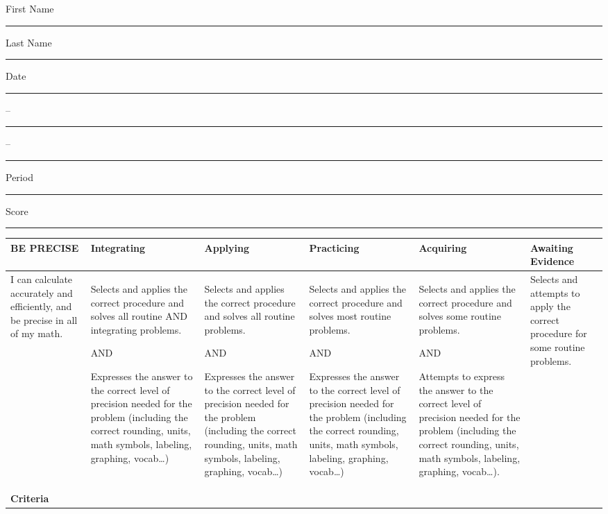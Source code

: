 \documentclass[twoside, 10pt]{article}
\title{}
\date{}
\begin{document}
\noindent
{\large
First Name \rule{6em}{.1pt}Last Name \rule{6em}{.1pt} Date \rule{1.5em}{.1pt} -- \rule{1.5em}{.1pt} -- \rule{1.5em}{.1pt} Period \rule{2em}{.1pt} Score \rule{2em}{.1pt}
}
\vspace{1em}

\begingroup
\renewcommand{\arraystretch}{1.5}
\begin{center}
\tiny
{
\begin{tabularx}{\textwidth}{|X|X|X|X|X|X|}
\hline
\bf BE PRECISE & \centerline{Integrating} & \centerline{Applying} & \centerline{Practicing} & \centerline{Acquiring} & \centerline{Awaiting Evidence} \\
\hline
I can calculate accurately and efficiently, and be precise in all of my math.&
Selects and applies the correct procedure and solves all routine AND integrating problems.

AND

Expresses the answer to the correct level of precision needed for the problem (including the correct rounding, units, math symbols, labeling, graphing, vocab…)
&Selects and applies the correct procedure and solves all routine problems.


AND

Expresses the answer to the correct level of precision needed for the problem (including the correct rounding, units, math symbols, labeling, graphing, vocab…)
&Selects and applies the correct procedure and solves most routine problems.


AND

Expresses the answer to the correct level of precision needed for the problem (including the correct rounding, units, math symbols, labeling, graphing, vocab…)
&Selects and applies the correct procedure and solves some routine problems.


AND

Attempts to express the answer to the correct level of precision needed for the problem (including the correct rounding, units, math symbols, labeling, graphing, vocab…).
&Selects and attempts to apply the correct procedure for some routine problems.\\
\hline
\bf Criteria&\multicolumn{5}{l|}{\parbox[c][4em]{.8\textwidth}{}}\\
\hline
\end{tabularx}
}
\end{center}
\endgroup
\vspace{1em}
\end{document}
